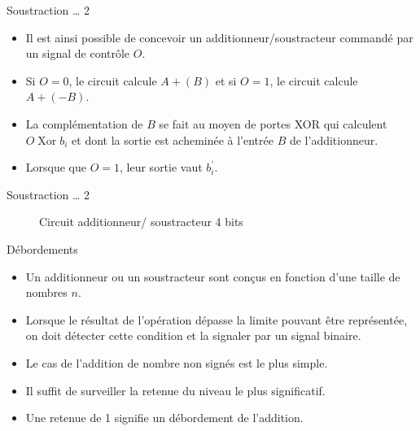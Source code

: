 \documentclass[presentation]{beamer}
\begin{document}
\begin{frame}[label={sec:org7ce38c0}]{Soustraction \ldots{} 2}
\begin{itemize}
\item Il est ainsi possible de concevoir un additionneur/soustracteur commandé par un signal de contrôle \(O\).

\item Si \(O=0\), le circuit calcule \(A + (B)\) et si \(O=1\), le circuit calcule \(A + (-B)\).

\item La complémentation de \(B\) se fait au moyen de portes XOR qui calculent \(O \operatorname{Xor} b_i\) et dont la sortie est acheminée à l'entrée \(B\) de l'additionneur.

\item Lorsque que \(O=1\), leur sortie vaut \(b_i^\prime\).
\end{itemize}
\end{frame}

\begin{frame}[label={sec:org62bea52}]{Soustraction \ldots{} 2}
\begin{figure}[htbp]
\centering

\caption{\label{fig:org3d25702}Circuit additionneur/ soustracteur 4 bits}
\end{figure}
\end{frame}

\begin{frame}[label={sec:org39de452}]{Débordements}
\begin{itemize}
\item Un additionneur ou un soustracteur sont conçus en fonction d'une taille de nombres \(n\).

\item Lorsque le résultat de l'opération dépasse la limite pouvant être représentée, on doit détecter cette condition et la signaler par un signal binaire.

\item Le cas de l'addition de nombre non signés est le plus simple.

\item Il suffit de surveiller la retenue du niveau le plus significatif.

\item Une retenue de 1 signifie un débordement de l'addition.
\end{itemize}
\end{frame}
\end{document}
